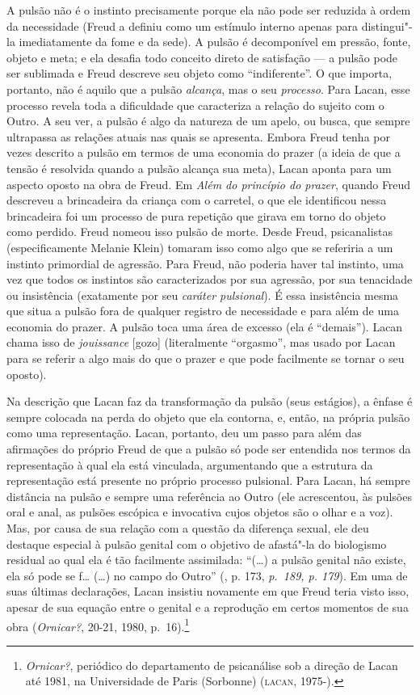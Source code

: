 A pulsão não é o instinto precisamente porque ela não pode ser reduzida
à ordem da necessidade (Freud a definiu como um estímulo interno apenas
para distingui"-la imediatamente da fome e da sede). A pulsão é
decomponível em pressão, fonte, objeto e meta; e ela desafia todo
conceito direto de satisfação --- a pulsão pode ser sublimada e Freud
descreve seu objeto como ``indiferente''. O que importa, portanto, não é
aquilo que a pulsão \emph{alcança}, mas o seu \emph{processo}. Para
Lacan, esse processo revela toda a dificuldade que caracteriza a relação
do sujeito com o Outro. A seu ver, a pulsão é algo da natureza de um
apelo, ou busca, que sempre ultrapassa as relações atuais nas quais se
apresenta. Embora Freud tenha por vezes descrito a pulsão em termos de
uma economia do prazer (a ideia de que a tensão é resolvida quando a
pulsão alcança sua meta), Lacan aponta para um aspecto oposto na obra de
Freud. Em \emph{Além do princípio do prazer}, quando Freud descreveu a
brincadeira da criança com o carretel, o que ele identificou nessa
brincadeira foi um processo de pura repetição que girava em torno do
objeto como perdido. Freud nomeou isso pulsão de morte. Desde Freud,
psicanalistas (especificamente Melanie Klein) tomaram isso como algo que
se referiria a um instinto primordial de agressão. Para Freud, não
poderia haver tal instinto, uma vez que todos os instintos são
caracterizados por sua agressão, por sua tenacidade ou insistência
(exatamente por seu \emph{caráter pulsional}). É essa insistência mesma
que situa a pulsão fora de qualquer registro de necessidade e para além
de uma economia do prazer. A pulsão toca uma área de excesso (ela é
``demais''). Lacan chama isso de \emph{jouissance} {[}gozo{]}
(literalmente ``orgasmo'', mas usado por Lacan para se referir a algo
mais do que o prazer e que pode facilmente se tornar o seu oposto).

Na descrição que Lacan faz da transformação da pulsão (seus estágios), a
ênfase é sempre colocada na perda do objeto que ela contorna, e, então,
na própria pulsão como uma representação. Lacan, portanto, deu um passo
para além das afirmações do próprio Freud de que a pulsão só pode ser
entendida nos termos da representação à qual ela está vinculada,
argumentando que a estrutura da representação está presente no próprio
processo pulsional. Para Lacan, há sempre distância na pulsão e sempre
uma referência ao Outro (ele acrescentou, às pulsões oral e anal, as
pulsões escópica e invocativa cujos objetos são o olhar e a voz). Mas,
por causa de sua relação com a questão da diferença sexual, ele deu
destaque especial à pulsão genital com o objetivo de afastá"-la do
biologismo residual ao qual ela é tão facilmente assimilada: ``(\ldots{}) a
pulsão genital não existe, ela só pode se f\ldots{} (\ldots{}) no campo do Outro''
(, p. 173, \emph{p.~189, p. 179}). Em uma de suas últimas declarações,
Lacan insistiu novamente em que Freud teria visto isso, apesar de sua
equação entre o genital e a reprodução em certos momentos de sua obra
(\emph{Ornicar?}, 20-21, 1980, p.~16).\footnote{\emph{Ornicar?},
  periódico do departamento de psicanálise sob a direção de Lacan até
  1981, na Universidade de Paris  (Sorbonne) (\textsc{lacan}, 1975-).} %

